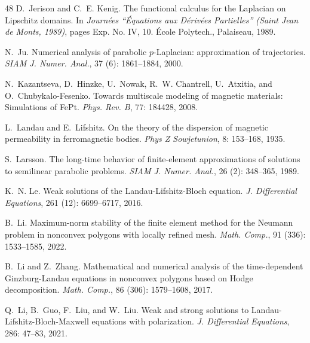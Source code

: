 \documentclass[11pt,reqno]{amsart}
\theoremstyle{definition}
\numberwithin{equation}{section}
\begin{document}
\begin{thebibliography}{48}
	D.~Jerison and C.~E. Kenig.
	\newblock The functional calculus for the {L}aplacian on {L}ipschitz domains.
	\newblock In \emph{Journ\'ees ``\'Equations aux {D}\'eriv\'ees {P}artielles''
		({S}aint {J}ean de {M}onts, 1989)}, pages Exp. No. IV, 10. \'Ecole Polytech.,
	Palaiseau, 1989.
	
	N.~Ju.
	\newblock Numerical analysis of parabolic {$p$}-{L}aplacian: approximation of
	trajectories.
	\newblock \emph{SIAM J. Numer. Anal.}, 37 (6): 1861--1884,
	2000.
	
	N.~Kazantseva, D.~Hinzke, U.~Nowak, R.~W. Chantrell, U.~Atxitia, and
	O.~Chubykalo-Fesenko.
	\newblock Towards multiscale modeling of magnetic materials: Simulations of
	{F}e{P}t.
	\newblock \emph{Phys. Rev. B}, 77: 184428, 2008.
	
	L.~Landau and E.~Lifshitz.
	\newblock On the theory of the dispersion of magnetic permeability in
	ferromagnetic bodies.
	\newblock \emph{Phys Z Sowjetunion}, 8: 153--168, 1935.
	
	S.~Larsson.
	\newblock The long-time behavior of finite-element approximations of solutions
	to semilinear parabolic problems.
	\newblock \emph{SIAM J. Numer. Anal.}, 26 (2): 348--365,
	1989.
	
	K.~N. Le.
	\newblock Weak solutions of the {L}andau-{L}ifshitz-{B}loch equation.
	\newblock \emph{J. Differential Equations}, 261 (12):
	6699--6717, 2016.
	
	B.~Li.
	\newblock Maximum-norm stability of the finite element method for the {N}eumann
	problem in nonconvex polygons with locally refined mesh.
	\newblock \emph{Math. Comp.}, 91 (336): 1533--1585, 2022.
	
	B.~Li and Z.~Zhang.
	\newblock Mathematical and numerical analysis of the time-dependent
	{G}inzburg-{L}andau equations in nonconvex polygons based on {H}odge
	decomposition.
	\newblock \emph{Math. Comp.}, 86 (306): 1579--1608, 2017.
	
	Q.~Li, B.~Guo, F.~Liu, and W.~Liu.
	\newblock Weak and strong solutions to {L}andau-{L}ifshitz-{B}loch-{M}axwell
	equations with polarization.
	\newblock \emph{J. Differential Equations}, 286: 47--83, 2021.
	

\end{thebibliography}
\end{document}
